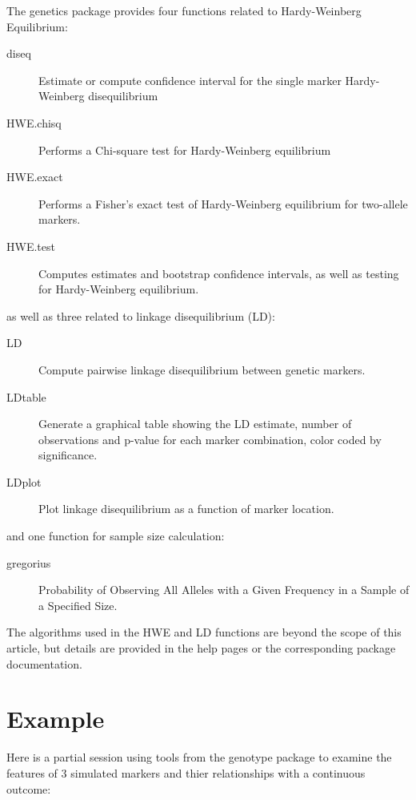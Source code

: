\documentclass{report}
\begin{document}
The genetics package provides four functions related to Hardy-Weinberg Equilibrium:
\begin{description}
\item[diseq] Estimate or compute confidence interval for the
  single marker Hardy-Weinberg disequilibrium
\item[HWE.chisq] Performs a Chi-square test for Hardy-Weinberg equilibrium
\item[HWE.exact] Performs a Fisher's exact test of Hardy-Weinberg equilibrium for two-allele markers.
\item[HWE.test] Computes estimates and bootstrap confidence intervals,
  as well as testing for Hardy-Weinberg equilibrium.
\end{description}
as well as three related to linkage disequilibrium (LD):
\begin{description}
\item[LD] Compute pairwise linkage disequilibrium between genetic markers.
\item[LDtable] Generate a graphical table showing the LD estimate,
  number of observations and p-value for each marker combination,
  color coded by significance.
\item[LDplot] Plot linkage disequilibrium as a function of marker location.
\end{description}
and one function for sample size calculation:
\begin{description}
\item[gregorius] Probability of Observing All Alleles with a Given
  Frequency in a Sample of a Specified Size.  
\end{description}
The algorithms used in the HWE and LD functions are beyond the scope
of this article, but details are provided in the help pages or the
corresponding package documentation.

\section{Example}

Here is a partial session using tools from the genotype package to
examine the features of 3 simulated markers and thier relationships
with a continuous outcome:
\end{document}
